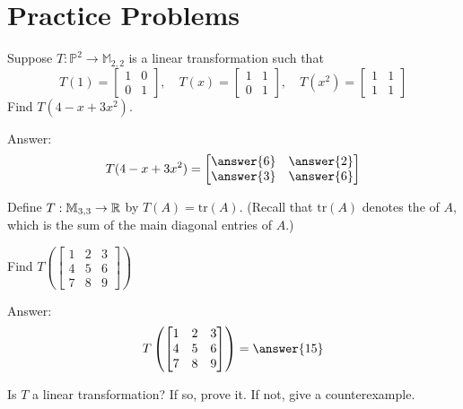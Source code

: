 \documentclass{ximera}
\begin{document}


\section*{Practice Problems}
\begin{problem}\label{prob:lintransP2toM22}
Suppose $T:\mathbb{P}^2\rightarrow\mathbb{M}_{2,2}$ is a linear transformation such that 
$$T(1)=\begin{bmatrix}1&0\\0&1\end{bmatrix},\quad T(x)=\begin{bmatrix}1&1\\0&1\end{bmatrix},\quad T(x^2)=\begin{bmatrix}1&1\\1&1\end{bmatrix}$$
Find $T(4-x+3x^2)$.

Answer:$$T(4-x+3x^2)=\begin{bmatrix}\answer{6}&\answer{2}\\\answer{3}&\answer{6}\end{bmatrix}$$

\end{problem}

\begin{problem}
Define $T:\mathbb{M}_{3,3}\rightarrow \mathbb{R}$ by $T(A)=\mbox{tr}(A)$.  (Recall that $\mbox{tr}(A)$ denotes the  of $A$, which is the sum of the main diagonal entries of $A$.)

\begin{problem}\label{prob:tracelintrans1}
Find $T\left(\begin{bmatrix}1&2&3\\4&5&6\\7&8&9\end{bmatrix}\right)$

Answer: $$T\left(\begin{bmatrix}1&2&3\\4&5&6\\7&8&9\end{bmatrix}\right)=\answer{15}$$
\end{problem}

\begin{problem}\label{prob:tracelintrans2}
Is $T$ a linear transformation?  If so, prove it.  If not, give a counterexample.
\end{problem}
\end{problem}
\end{document}
